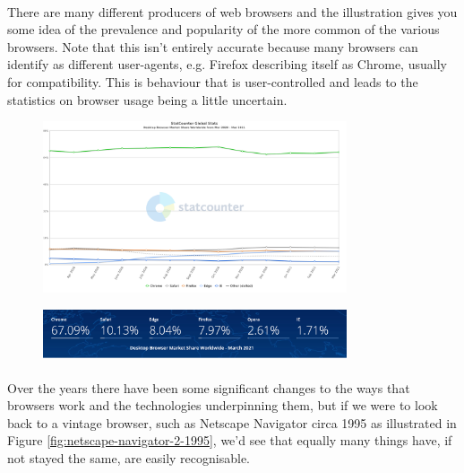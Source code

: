 \paragraph{} There are many different producers of web browsers and the illustration gives you some idea of the prevalence and popularity of the more common of the various browsers. Note that this isn't entirely accurate because many browsers can identify as different user-agents, e.g. Firefox describing itself as Chrome, usually for compatibility. This is behaviour that is user-controlled and leads to the statistics on browser usage being a little uncertain.


\begin{figure}[H]
\centering
\includegraphics[width=0.8\textwidth]{figures/browser-stats-1.png}
\label{fig:browser-stats-1}
\end{figure}


\begin{figure}[H]
\centering
\includegraphics[width=0.8\textwidth]{figures/browser-stats-2.png}
\label{fig:browser-stats-2}
\end{figure}

\paragraph{} Over the years there have been some significant changes to the ways that browsers work and the technologies underpinning them, but if we were to look back to a vintage browser, such as Netscape Navigator circa 1995 as illustrated in Figure \ref{fig:netscape-navigator-2-1995}, we'd see that equally many things have, if not stayed the same, are easily recognisable.

